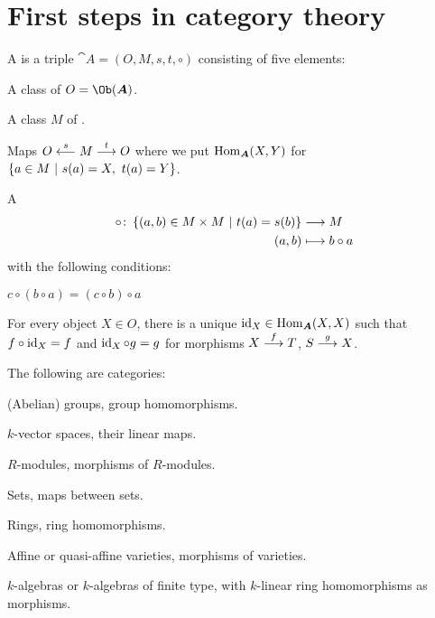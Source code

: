 \documentclass[a4paper,parskip=half,numbers=enddot, DIV=12]{scrreprt}
\begin{document}
	\section{First steps in category theory}
	\begin{defi}
		A  is a triple ${\cat A} = (O,M,s,t,\circ)$ consisting of five elements:
		\begin{alphanumerate}
			\item A class of  $O=\Ob({\cat A})$.
			\item A class $M$ of .
			\item Maps $O\overset{s}{\longot} M \morphism[t] O$ where we put $\Hom_{\cat A}(X,Y)$ for $\left\{a\in M\ \middle|\  s(a) = X, \ t(a) = Y\right\}$.
			\item A 
			\begin{align*}
			\circ\colon \left\{(a,b)\in M\times M \ \middle|\  t(a) = s(b)\right\} &\longrightarrow M\\
			(a,b) &\longmapsto b\circ a         
			\end{align*}
			with the following conditions:
			\begin{alphanumerate}
				\item[\itememph{\alpha}] $c\circ(b\circ a) = (c\circ b) \circ a$
				\item[\itememph{\beta}] For every object $X\in O$, there is a unique $\id_X\in \Hom_{\cat A}(X,X)$ such that $f\circ \operatorname{id}_X = f$ and $\operatorname{id}_X\circ g = g$ for morphisms $X\morphism[f] T$, $S\morphism[g] X$.
			\end{alphanumerate}
		\end{alphanumerate}
	\end{defi}
	\begin{example*} The following are categories:
		\begin{alphanumerate}
			\item (Abelian) groups, group homomorphisms.
			\item $k$-vector spaces, their linear maps.
			\item $R$-modules, morphisms of $R$-modules.
			\item Sets, maps between sets.
			\item Rings, ring homomorphisms.
			\item Affine or quasi-affine varieties, morphisms of varieties. 
			\item $k$-algebras or $k$-algebras of finite type, with $k$-linear ring homomorphisms as morphisms.
		\end{alphanumerate}
	\end{example*}
\end{document}
